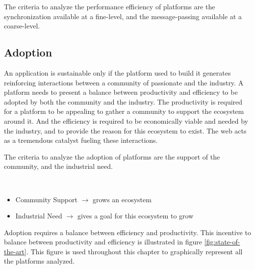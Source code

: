 \separator

The criteria to analyze the performance efficiency of platforms are the synchronization available at a fine-level, and the message-passing available at a coarse-level.


\subsection{Adoption} \label{chapter3:definitions:adoption}

An application is sustainable only if the platform used to build it generates reinforcing interactions between a community of passionate and the industry.
A platform needs to present a balance between productivity and efficiency to be adopted by both the community and the industry.
The productivity is required for a platform to be appealing to gather a community to support the ecosystem around it.
And the efficiency is required to be economically viable and needed by the industry, and to provide the reason for this ecosystem to exist.
The web acts as a tremendous catalyst fueling these interactions.

\separator

The criteria to analyze the adoption of platforms are the support of the community, and the industrial need.

\atomic {
  \begin{itemize}
  \item Community Support
    \subitem $\to$ grows an ecosystem
  \item Industrial Need
    \subitem $\to$ gives a goal for this ecosystem to grow
  \end{itemize}
}

\separator

Adoption requires a balance between efficiency and productivity.
This incentive to balance between productivity and efficiency is illustrated in figure \ref{fig:state-of-the-art}.
This figure is used throughout this chapter to graphically represent all the platforms analyzed.

\begin{figure}[h!]
%
\end{figure}